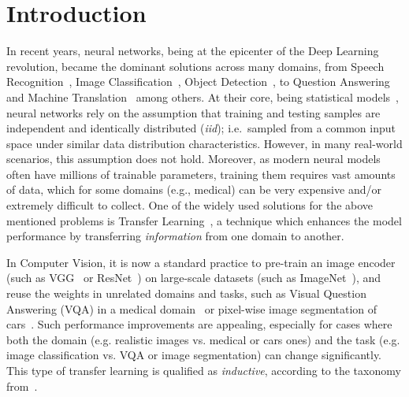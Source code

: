 \section{Introduction}
In recent years, neural networks, being at the epicenter of the Deep Learning~\cite{lecun2015deep} revolution, became the dominant solutions across many domains, from Speech Recognition~\cite{graves2013speech}, Image Classification~\cite{krizhevsky2012imagenet}, Object Detection~\cite{redmon2016you}, to Question Answering~\cite{weston2014memory} and Machine Translation~\cite{bahdanau2014neural} among others.
At their core, being statistical models~\cite{ripley1993statistical,warner1996understanding}, neural networks rely on the assumption that training and testing samples are independent and identically distributed (\textit{iid}); i.e.\ sampled from a common input space under similar data distribution characteristics.
However, in many real-world scenarios, this assumption does not hold. Moreover, as modern neural models often have millions of trainable parameters, training them requires vast amounts of data, which for some domains (e.g., medical) can be very expensive and/or extremely difficult to collect.
One of the widely used solutions for the above mentioned problems is Transfer Learning~\cite{pan2009survey,weiss2016survey}, a technique which enhances the  model performance by transferring \emph{information} from one domain to another.


In Computer Vision, it is now a standard practice to pre-train an image encoder (such as VGG~\cite{simonyan2014very} or ResNet~\cite{he2016deep}) on large-scale datasets (such as ImageNet~\cite{deng2009imagenet}), and reuse the weights in unrelated domains and tasks, such as Visual Question Answering (VQA) in a medical domain~\cite{kornuta2019leveraging} or pixel-wise image segmentation of cars~\cite{iglovikov2018ternausnet}.
Such performance improvements are appealing, especially for cases where both the domain (e.g. realistic images vs. medical or cars ones) and the task (e.g. image classification vs. VQA or image segmentation) can change significantly. This type of transfer learning is qualified as \emph{inductive}, according to the taxonomy from~\cite{pan2009survey}.


